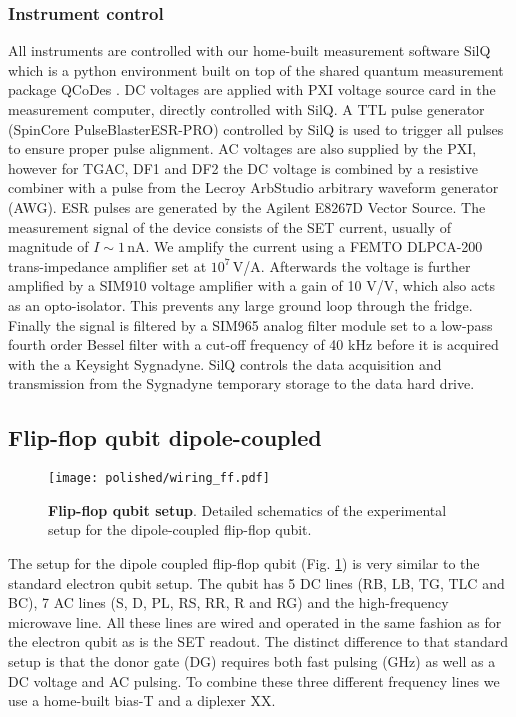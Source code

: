 \subsubsection{Instrument control}
All instruments are controlled with our home-built measurement software SilQ \cite{SilQ} which is a python environment built on top of the shared quantum measurement package QCoDes \cite{QCodes}. DC voltages are applied with PXI voltage source card in the measurement computer, directly controlled with SilQ. A TTL pulse generator (SpinCore PulseBlasterESR-PRO) controlled by SilQ is used to trigger all pulses to ensure proper pulse alignment. AC voltages are also supplied by the PXI, however for TGAC, DF1 and DF2 the DC voltage is combined by a resistive combiner with a pulse from the Lecroy ArbStudio arbitrary waveform generator (AWG). ESR pulses are generated by the Agilent E8267D Vector Source. 
The measurement signal of the device consists of the SET current, usually of magnitude of $I\sim 1\,$nA. We amplify the current using a FEMTO DLPCA-200 trans-impedance amplifier set at $10^7\,$V/A. Afterwards the voltage is further amplified by a SIM910 voltage amplifier with a gain of 10 V/V, which also acts as an opto-isolator. This prevents any large ground loop through the fridge. Finally the signal is filtered by a SIM965 analog filter module set to a low-pass fourth order Bessel filter with a cut-off frequency of 40 kHz before it is acquired with the a Keysight Sygnadyne. SilQ controls the data acquisition and transmission from the Sygnadyne temporary storage to the data hard drive.


\subsection{Flip-flop qubit dipole-coupled} \label{sec:setup_dd}

\begin{figure}
	\centering
	\texttt{[image: polished/wiring\_ff.pdf]}
	\caption[Flip-flop qubit setup]{\textbf{Flip-flop qubit setup}. Detailed schematics of the experimental setup for the dipole-coupled flip-flop qubit.  }
	\label{fig:dd_setup}
\end{figure}

The setup for the dipole coupled flip-flop qubit (Fig. \ref{fig:dd_setup}) is very similar to the standard electron qubit setup. The qubit has 5 DC lines (RB, LB, TG,  TLC and BC), 7 AC lines (S, D, PL, RS, RR, R and RG) and the high-frequency microwave line. All these lines are wired and operated in the same fashion as for the electron qubit as is the SET readout. The distinct difference to that standard setup is that the donor gate (DG) requires both fast pulsing (GHz) as well as a DC voltage and AC pulsing. To combine these three different frequency lines we use a home-built bias-T and a diplexer XX. 

